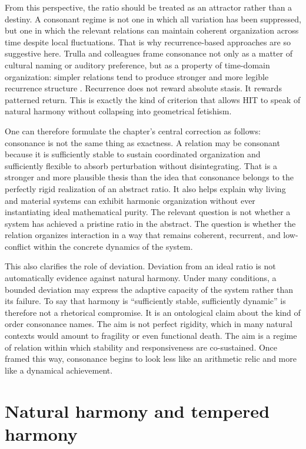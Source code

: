 From this perspective, the ratio should be treated as an attractor rather than a destiny. A consonant regime is not one in which all variation has been suppressed, but one in which the relevant relations can maintain coherent organization across time despite local fluctuations. That is why recurrence-based approaches are so suggestive here. Trulla and colleagues frame consonance not only as a matter of cultural naming or auditory preference, but as a property of time-domain organization: simpler relations tend to produce stronger and more legible recurrence structure \parencite{trulla_2018}. Recurrence does not reward absolute stasis. It rewards patterned return. This is exactly the kind of criterion that allows HIT to speak of natural harmony without collapsing into geometrical fetishism.

One can therefore formulate the chapter's central correction as follows: consonance is not the same thing as exactness. A relation may be consonant because it is sufficiently stable to sustain coordinated organization and sufficiently flexible to absorb perturbation without disintegrating. That is a stronger and more plausible thesis than the idea that consonance belongs to the perfectly rigid realization of an abstract ratio. It also helps explain why living and material systems can exhibit harmonic organization without ever instantiating ideal mathematical purity. The relevant question is not whether a system has achieved a pristine ratio in the abstract. The question is whether the relation organizes interaction in a way that remains coherent, recurrent, and low-conflict within the concrete dynamics of the system.

This also clarifies the role of deviation. Deviation from an ideal ratio is not automatically evidence against natural harmony. Under many conditions, a bounded deviation may express the adaptive capacity of the system rather than its failure. To say that harmony is \enquote{sufficiently stable, sufficiently dynamic} is therefore not a rhetorical compromise. It is an ontological claim about the kind of order consonance names. The aim is not perfect rigidity, which in many natural contexts would amount to fragility or even functional death. The aim is a regime of relation within which stability and responsiveness are co-sustained. Once framed this way, consonance begins to look less like an arithmetic relic and more like a dynamical achievement.


\section{Natural harmony and tempered harmony}


